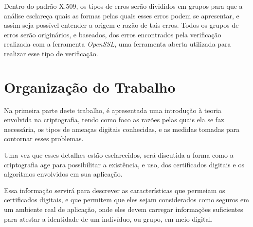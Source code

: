 	Dentro do padrão X.509, os tipos de erros serão divididos em grupos para que a análise esclareça quais as formas pelas quais esses erros podem se apresentar, e assim seja possível entender a origem e razão de tais erros. Todos os grupos de erros serão originários, e baseados, dos erros encontrados pela verificação realizada com a ferramenta \textit{OpenSSL}, uma ferramenta aberta utilizada para realizar esse tipo de verificação.

\section[Orgaanização do Trabalho]{Organização do Trabalho}
	
	Na primeira parte deste trabalho, é apresentada uma introdução à teoria envolvida na criptografia, tendo como foco as razões pelas quais ela se faz necessária, os tipos de ameaças digitais conhecidas, e as medidas tomadas para contornar esses problemas.
	
	Uma vez que esses detalhes estão esclarecidos, será discutida a forma como a criptografia age para possibilitar a existência, e uso, dos certificados digitais e os algoritmos envolvidos em sua aplicação.
	
	Essa informação servirá para descrever as características que permeiam os certificados digitais, e que permitem que eles sejam considerados como seguros em um ambiente real de aplicação, onde eles devem carregar informações suficientes para atestar a identidade de um indivíduo, ou grupo, em meio digital.
